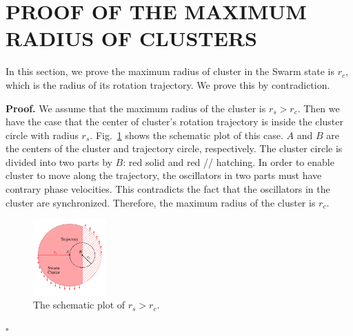 \documentclass[%
 aip,
 amsmath,amssymb,
 reprint,%
]{revtex4-1}
\newenvironment{proof}{\noindent\textbf{Proof.}}{\hfill $\square$\par}
\begin{document}
\section{\label{sec:maxRadius} PROOF OF THE MAXIMUM RADIUS OF CLUSTERS}

In this section, we prove the maximum radius of cluster in the Swarm state is $r_c$, which is the radius of its rotation trajectory. We prove this by contradiction.

\begin{proof}
    We assume that the maximum radius of the cluster is $r_s>r_c$. Then we have the case that the center of cluster's rotation trajectory is inside the cluster circle with radius $r_s$. 
    Fig.~\ref{fig:rsProofEps} shows the schematic plot of this case. $A$ and $B$ 
    are the centers of the cluster and trajectory circle, respectively. The cluster circle is divided into two parts by $B$: red solid and red // hatching. In order to enable cluster to move along the trajectory, the oscillators in two parts must have contrary phase velocities. This contradicts the fact that the oscillators in the cluster are synchronized. Therefore, the maximum radius of the cluster is $r_c$.

    \begin{figure}
        \includegraphics[width=0.25\textwidth]{./figs/rsProofEps.pdf}
        \caption{
            \label{fig:rsProofEps} The schematic plot of $r_s>r_c$.
        }
    \end{figure}

\end{proof}
\end{document}
